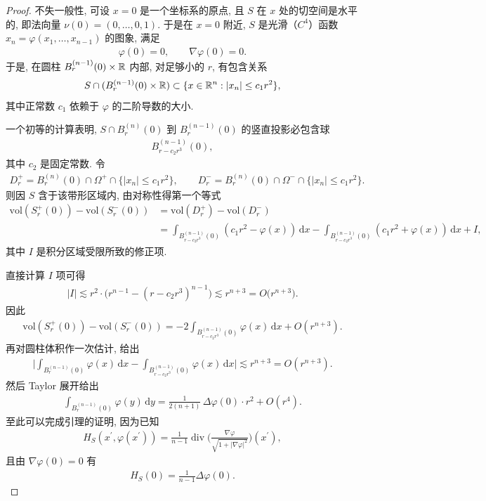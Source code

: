 \begin{proof}
不失一般性, 可设 $x = 0$ 是一个坐标系的原点, 且 $S$ 在 $x$ 处的切空间是水平的, 即法向量 $\nu(0) = (0, \ldots, 0, 1)$. 于是在 $x = 0$ 附近, $S$ 是光滑（$C^4$）函数 $x_n = \varphi(x_1, \ldots, x_{n-1})$ 的图象, 满足
\begin{align*}
  \varphi(0)=0,\qquad \nabla\varphi(0)=0.
\end{align*}
于是, 在圆柱 $B_r^{(n-1)}(0) \times \mathbb{R}$ 内部, 对足够小的 $r$, 有包含关系
\begin{align*}
  S\cap(B_{r}^{(n-1)}(0)\times\mathbb{R})\subset\{x\in\mathbb{R}^{n}:|x_{n}|\leq c_{1}r^{2}\},
\end{align*}
其中正常数 $c_{1}$ 依赖于 $\varphi$ 的二阶导数的大小.

一个初等的计算表明, $S \cap B_r^{(n)}(0)$ 到 $B_r^{(n-1)}(0)$ 的竖直投影必包含球
\begin{align*}
  B_{r-c_{2}r^{3}}^{(n-1)}(0),
\end{align*}
其中 $c_{2}$ 是固定常数. 令
\begin{align*}
  D_{r}^{+}=B_{r}^{(n)}(0)\cap\Omega^{+}\cap\{|x_{n}|\leq c_{1}r^{2}\},\qquad
  D_{r}^{-}=B_{r}^{(n)}(0)\cap\Omega^{-}\cap\{|x_{n}|\leq c_{1}r^{2}\}.
\end{align*}
则因 $S$ 含于该带形区域内, 由对称性得第一个等式
\begin{align*}
  \mathrm{vol}(S_{r}^{+}(0))-\mathrm{vol}(S_{r}^{-}(0))
  &=\mathrm{vol}(D_{r}^{+})-\mathrm{vol}(D_{r}^{-})\\
  &=\int_{B_{r-c_{2}r^{3}}^{(n-1)}(0)}(c_{1}r^{2}-\varphi(x))\,\mathrm{d}x
   -\int_{B_{r-c_{2}r^{3}}^{(n-1)}(0)}(c_{1}r^{2}+\varphi(x))\,\mathrm{d}x+I,
\end{align*}
其中 $I$ 是积分区域受限所致的修正项.

直接计算 $I$ 项可得
\begin{align*}
  |I|\lesssim r^{2}\cdot\bigl(r^{n-1}-(r-c_{2}r^{3})^{n-1}\bigr)\lesssim r^{n+3}=O\bigl(r^{n+3}\bigr).
\end{align*}
因此
\begin{align*}
  \mathrm{vol}(S_{r}^{+}(0))-\mathrm{vol}(S_{r}^{-}(0))
  =-2\int_{B_{r-c_{2}r^{3}}^{(n-1)}(0)}\varphi(x)\,\mathrm{d}x+O(r^{n+3}).
\end{align*}
再对圆柱体积作一次估计, 给出
\begin{align*}
  \bigg|\int_{B_{r}^{(n-1)}(0)}\varphi(x)\,\mathrm{d}x-\int_{B_{r-c_{2}r^{3}}^{(n-1)}(0)}\varphi(x)\,\mathrm{d}x\bigg|
  \lesssim r^{n+3}=O(r^{n+3}).
\end{align*}
然后 Taylor 展开给出
\begin{align*}
  \int_{B_{r}^{(n-1)}(0)}\varphi(y)\,\mathrm{d}y
  =\frac{1}{2(n+1)}\,\Delta\varphi(0)\cdot r^{2}+O(r^{4}).
\end{align*}
至此可以完成引理的证明, 因为已知
\begin{align*}
  H_{S}(x^{\prime},\varphi(x^{\prime}))
  =\frac{1}{n-1}\operatorname{div}\Big(\frac{\nabla\varphi}{\sqrt{1+|\nabla\varphi|^{2}}}\Big)(x^{\prime}),
\end{align*}
且由 $\nabla\varphi(0)=0$ 有
\begin{align*}
  H_{S}(0)=\frac{1}{n-1}\Delta\varphi(0).
\end{align*}
\end{proof}

